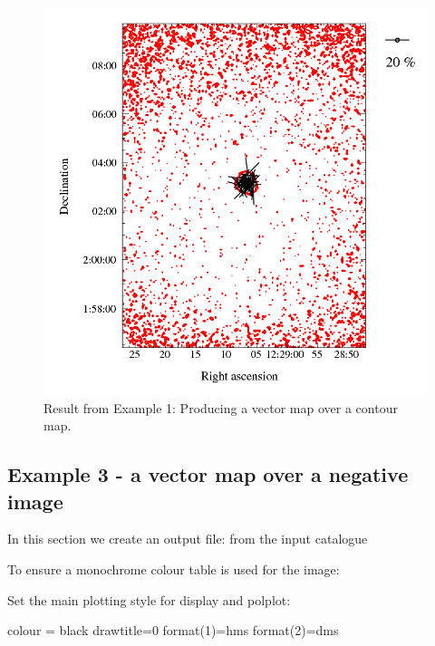 \begin{figure}[t!]
\begin{center}
\includegraphics[width=0.75\linewidth]{sc22-kappa-plots-plot2.png}

\caption [Vector map with contour map in polplot]{Result from Example
  1: Producing a vector map over a contour map.\label{fig:kappa-plot2}}
\end{center}
\end{figure}

\subsection{ Example 3 - a vector map over a negative image}
\label{section:kappa-example3}


In this section we create an output file:  from the input
catalogue 

\begin{terminalv}
\end{terminalv}


To ensure a monochrome colour table is used for the image:

\begin{terminalv}
\end{terminalv}


Set the main plotting style for display and polplot:

\begin{terminalv}
colour = black
drawtitle=0
format(1)=hms
format(2)=dms
\end{terminalv}


